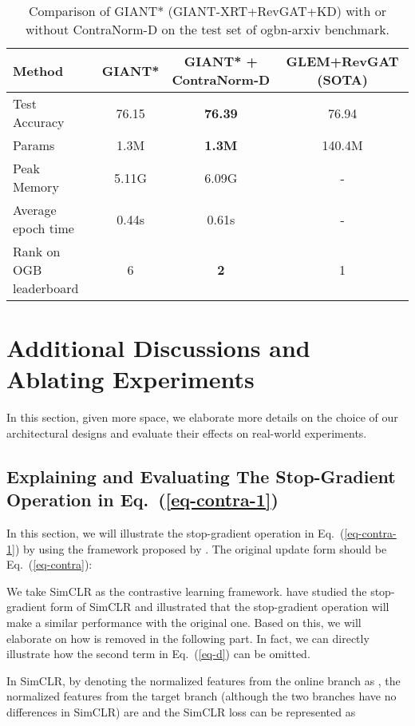 \documentclass{article}
\theoremstyle{definition}
\theoremstyle{remark}
\theoremstyle{theorem}
\begin{document}
\begin{table}[h]
	\centering
	\caption{Comparison of GIANT* (GIANT-XRT+RevGAT+KD) with or without ContraNorm-D on the test set of ogbn-arxiv benchmark. } 
	\begin{tabular}{l cc|c}
		\toprule
		\textbf{Method} & GIANT* & GIANT* + ContraNorm-D & GLEM+RevGAT (SOTA) \\
		\midrule
		Test Accuracy & 76.15 & \textbf{76.39} & 76.94 \\
            Params & 1.3M & \textbf{1.3M} & 140.4M \\
            Peak Memory & 5.11G & 6.09G & - \\
            Average epoch time & 0.44s & 0.61s & - \\
		Rank on OGB leaderboard &  6 & \textbf{2} & 1 \\
  \bottomrule    
	\end{tabular}
	\label{table:cn-d}
\end{table}


\section{Additional Discussions and Ablating Experiments}

In this section, given more space, we elaborate more details on the choice of our architectural designs and evaluate their effects on real-world experiments.

\subsection{Explaining and Evaluating The Stop-Gradient Operation in Eq.~(\ref{eq-contra-1})}
\label{stop-gradient}
In this section, we will illustrate the stop-gradient operation in Eq.~(\ref{eq-contra-1}) by using the framework proposed by \cite{tao2022exploring}. The original update form should be Eq.~(\ref{eq-contra}):

We take SimCLR \citep{chen2020simple} as the contrastive learning framework. \cite{tao2022exploring} have studied the stop-gradient form of SimCLR and illustrated that the stop-gradient operation will make a similar performance with the original one. Based on this, we will elaborate on how  is removed in the following part. In fact, we can directly illustrate how the second term in Eq.~(\ref{eq-d}) can be omitted.


In SimCLR, by denoting the normalized features from the online branch as , the normalized features from the target branch (although the two branches have no differences in SimCLR) are  and  the SimCLR loss can be represented as
\end{document}

